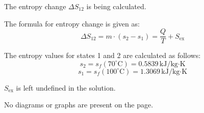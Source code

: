 The entropy change \( \Delta S_{12} \) is being calculated.  

The formula for entropy change is given as:  
\[
\Delta S_{12} = m \cdot (s_2 - s_1) = \frac{Q}{T} + S_{\text{ex}}
\]  

The entropy values for states 1 and 2 are calculated as follows:  
\[
s_2 = s_f(70^\circ\text{C}) = 0.5839 \, \text{kJ/kg·K}
\]  
\[
s_1 = s_f(100^\circ\text{C}) = 1.3069 \, \text{kJ/kg·K}
\]  

\( S_{\text{ex}} \) is left undefined in the solution.  

No diagrams or graphs are present on the page.